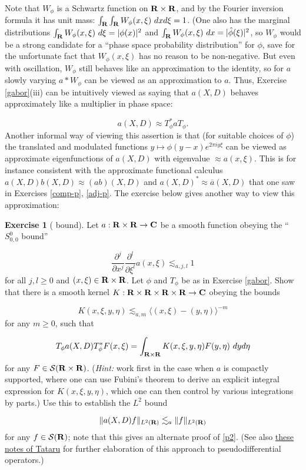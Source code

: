 \documentclass[11pt]{article}
\theoremstyle{definition}
\newtheorem{exercise}[theorem]{Exercise}
\theoremstyle{remark}
\begin{document}
Note that \({W_\phi}\) is a Schwartz function on \({{\bf R} \times {\bf R}}\), and by the Fourier inversion formula it has unit mass: \({\int_{\bf R} \int_{\bf R} W_\phi(x,\xi)\ dx d\xi = 1}\). (One also has the marginal distributions \({\int_{\bf R} W_\phi(x,\xi)\ d\xi = |\phi(x)|^2}\) and \({\int_{\bf R} W_\phi(x,\xi)\ dx = |\hat \phi(\xi)|^2}\), so \({W_\phi}\) would be a strong candidate for a “phase space probability distribution” for \({\phi}\), save for the unfortunate fact that \({W_\phi(x,\xi)}\) has no reason to be non-negative. But even with oscillation, \({W_\phi}\) still behaves like an approximation to the identity, so for \({a}\) slowly varying \({a*W_\phi}\) can be viewed as an approximation to \({a}\). Thus, Exercise \ref{gabor}(iii) can be intuitively viewed as saying that \({a(X,D)}\) behaves approximately like a multiplier in phase space: 

\[\displaystyle  a(X,D) \approx T_\phi^* a T_\phi.\]
 Another informal way of viewing this assertion is that (for suitable choices of \({\phi}\)) the translated and modulated functions \({y \mapsto \phi(y-x) e^{2\pi i y \xi}}\) can be viewed as approximate eigenfunctions of \({a(X,D)}\) with eigenvalue \({\approx a(x,\xi)}\). This is for instance consistent with the approximate functional calculus \({a(X,D) b(X,D) \approx (ab)(X,D)}\) and \({a(X,D)^* \approx \overline{a}(X,D)}\) that one saw in Exercises \ref{comp-p}, \ref{adj-p}. The exercise below gives another way to view this approximation:

\begin{exercise}[  bound]
  Let \({a: {\bf R} \times {\bf R} \rightarrow {\bf C}}\) be a smooth function obeying the “\({S^0_{0,0}}\) bound” 

\[\displaystyle \frac{\partial^j}{\partial x^j} \frac{\partial^l}{\partial \xi^l} a(x,\xi) \lesssim_{a,j,l} 1\]
 for all \({j,l \geq 0}\) and \({(x,\xi) \in {\bf R} \times {\bf R}}\). Let \({\phi}\) and \({T_\phi}\) be as in Exercise \ref{gabor}. Show that there is a smooth kernel \({K: {\bf R} \times {\bf R} \times {\bf R} \times {\bf R} \rightarrow {\bf C}}\) obeying the bounds 

\[\displaystyle  K( x,\xi, y,\eta ) \lesssim_{a,m} \langle (x,\xi) - (y,\eta) \rangle^{-m}\]
 for any \({m \geq 0}\), such that 

\[\displaystyle  T_\phi a(X,D) T_\phi^* F(x,\xi) = \int_{{\bf R} \times {\bf R}} K(x,\xi,y,\eta) F(y,\eta)\ dy d\eta\]
 for any \({F \in {\mathcal S}({\bf R} \times {\bf R})}\). (\emph{Hint:} work first in the case when \({a}\) is compactly supported, where one can use Fubini’s theorem to derive an explicit integral expression for \({K(x,\xi,y,\eta)}\), which one can then control by various integrations by parts.) Use this to establish the \({L^2}\) bound 

\[\displaystyle  \|a(X,D) f \|_{L^2({\bf R})} \lesssim_a \|f\|_{L^2({\bf R})}\]
 for any \({f \in {\mathcal S}({\bf R})}\); note that this gives an alternate proof of \eqref{p2}. (See also \href{https://math.berkeley.edu/~tataru/papers/phasespace.pdf}{these notes of Tataru} for further elaboration of this approach to pseudodifferential operators.) 

\end{exercise}
\end{document}
